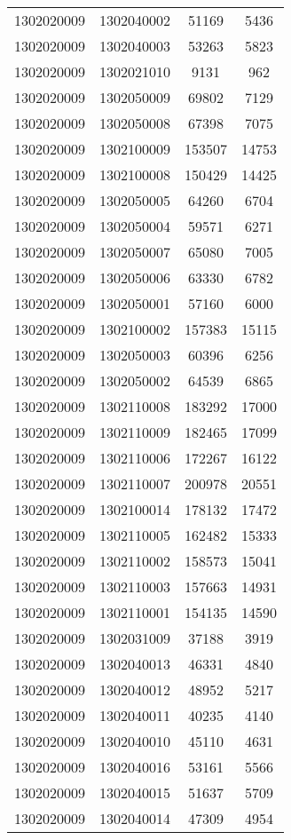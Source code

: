 \begin{longtable}{llcc}
1302020009 & 1302040002 & 51169 & 5436\\
1302020009 & 1302040003 & 53263 & 5823\\
1302020009 & 1302021010 & 9131 & 962\\
1302020009 & 1302050009 & 69802 & 7129\\
1302020009 & 1302050008 & 67398 & 7075\\
1302020009 & 1302100009 & 153507 & 14753\\
1302020009 & 1302100008 & 150429 & 14425\\
1302020009 & 1302050005 & 64260 & 6704\\
1302020009 & 1302050004 & 59571 & 6271\\
1302020009 & 1302050007 & 65080 & 7005\\
1302020009 & 1302050006 & 63330 & 6782\\
1302020009 & 1302050001 & 57160 & 6000\\
1302020009 & 1302100002 & 157383 & 15115\\
1302020009 & 1302050003 & 60396 & 6256\\
1302020009 & 1302050002 & 64539 & 6865\\
1302020009 & 1302110008 & 183292 & 17000\\
1302020009 & 1302110009 & 182465 & 17099\\
1302020009 & 1302110006 & 172267 & 16122\\
1302020009 & 1302110007 & 200978 & 20551\\
1302020009 & 1302100014 & 178132 & 17472\\
1302020009 & 1302110005 & 162482 & 15333\\
1302020009 & 1302110002 & 158573 & 15041\\
1302020009 & 1302110003 & 157663 & 14931\\
1302020009 & 1302110001 & 154135 & 14590\\
1302020009 & 1302031009 & 37188 & 3919\\
1302020009 & 1302040013 & 46331 & 4840\\
1302020009 & 1302040012 & 48952 & 5217\\
1302020009 & 1302040011 & 40235 & 4140\\
1302020009 & 1302040010 & 45110 & 4631\\
1302020009 & 1302040016 & 53161 & 5566\\
1302020009 & 1302040015 & 51637 & 5709\\
1302020009 & 1302040014 & 47309 & 4954\\

\end{longtable}
